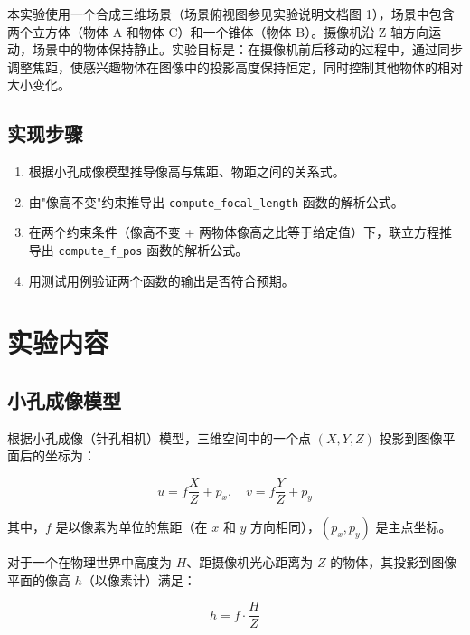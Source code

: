 \documentclass[12pt,a4paper]{ctexart}
\begin{document}
本实验使用一个合成三维场景（场景俯视图参见实验说明文档图 1），场景中包含两个立方体（物体 A 和物体 C）和一个锥体（物体 B）。摄像机沿 Z 轴方向运动，场景中的物体保持静止。实验目标是：在摄像机前后移动的过程中，通过同步调整焦距，使感兴趣物体在图像中的投影高度保持恒定，同时控制其他物体的相对大小变化。

\subsection{实现步骤}

\begin{enumerate}
  \item 根据小孔成像模型推导像高与焦距、物距之间的关系式。
  \item 由"像高不变"约束推导出 \texttt{compute\_focal\_length} 函数的解析公式。
  \item 在两个约束条件（像高不变 + 两物体像高之比等于给定值）下，联立方程推导出 \texttt{compute\_f\_pos} 函数的解析公式。
  \item 用测试用例验证两个函数的输出是否符合预期。
\end{enumerate}

\section{实验内容}

\subsection{小孔成像模型}

根据小孔成像（针孔相机）模型，三维空间中的一个点 $(X, Y, Z)$ 投影到图像平面后的坐标为：

\begin{equation}
  u = f \frac{X}{Z} + p_x, \quad v = f \frac{Y}{Z} + p_y
  \label{eq:pinhole}
\end{equation}

其中，$f$ 是以像素为单位的焦距（在 $x$ 和 $y$ 方向相同），$(p_x, p_y)$ 是主点坐标。

对于一个在物理世界中高度为 $H$、距摄像机光心距离为 $Z$ 的物体，其投影到图像平面的像高 $h$（以像素计）满足：

\begin{equation}
  h = f \cdot \frac{H}{Z}
  \label{eq:imgheight}
\end{equation}
\end{document}
